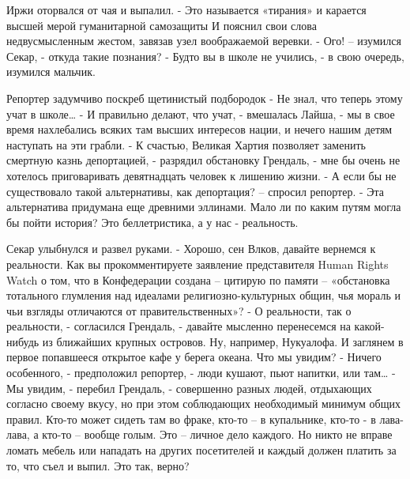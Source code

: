 \documentclass{book}
\begin{document}
Иржи оторвался от чая и выпалил.
- Это называется «тирания» и карается высшей мерой гуманитарной самозащиты
И пояснил свои слова недвусмысленным жестом, завязав узел воображаемой веревки.
- Ого! -- изумился Секар, - откуда такие познания?
- Будто вы в школе не учились, - в свою очередь, изумился мальчик.

Репортер задумчиво поскреб щетинистый подбородок
- Не знал, что теперь этому учат в школе\ldots{}
- И правильно делают, что учат, - вмешалась Лайша, - мы в свое время нахлебались всяких там высших интересов нации, и нечего нашим детям наступать на эти грабли.
- К счастью, Великая Хартия позволяет заменить смертную казнь депортацией, - разрядил обстановку Грендаль, - мне бы очень не хотелось приговаривать девятнадцать человек к лишению жизни.
- А если бы не существовало такой альтернативы, как депортация? -- спросил репортер.
- Эта альтернатива придумана еще древними эллинами. Мало ли по каким путям могла бы пойти история? Это беллетристика, а у нас - реальность.

Секар улыбнулся и развел руками.
- Хорошо, сен Влков, давайте вернемся к реальности. Как вы прокомментируете заявление представителя Human Rights Watch о том, что в Конфедерации создана -- цитирую по памяти -- «обстановка тотального глумления над идеалами религиозно-культурных общин, чья мораль и чьи взгляды отличаются от правительственных»?
- О реальности, так о реальности, - согласился Грендаль, - давайте мысленно перенесемся на какой-нибудь из ближайших крупных островов. Ну, например, Нукуалофа. И заглянем в первое попавшееся открытое кафе у берега океана. Что мы увидим?
- Ничего особенного, - предположил репортер, - люди кушают, пьют напитки, или там\ldots{}
- Мы увидим, - перебил Грендаль, - совершенно разных людей, отдыхающих согласно своему вкусу, но при этом соблюдающих необходимый минимум общих правил. Кто-то может сидеть там во фраке, кто-то -- в купальнике, кто-то - в лава-лава, а кто-то -- вообще голым. Это -- личное дело каждого. Но никто не вправе ломать мебель или нападать на других посетителей и каждый должен платить за то, что съел и выпил. Это так, верно?
\end{document}
